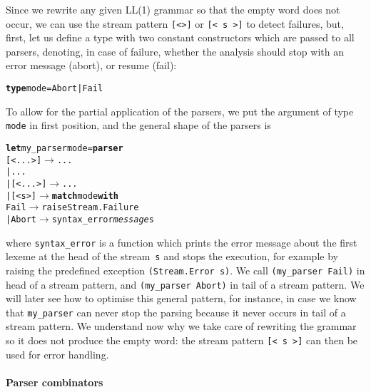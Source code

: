 Since we rewrite any given LL(1) grammar so that the empty word does
not occur, we can use the stream pattern \texttt{[<>]} or \texttt{[< s
    >]} to detect failures, but, first, let us define a type with two
constant constructors which are passed to all parsers, denoting, in
case of failure, whether the analysis should stop with an error
message (abort), or resume (fail):
\begin{alltt}
\textbf{type} mode = Abort | Fail
\end{alltt}
To allow for the partial application of the parsers, we put the
argument of type \texttt{mode} in first position, and the general
shape of the parsers is
\begin{alltt}
\textbf{let} my\_parser mode = \textbf{parser}
  [< ... >] \(\rightarrow\) ...
| ...
| [< ... >] \(\rightarrow\) ...
|   [< s >] \(\rightarrow\) \textbf{match} mode \textbf{with}
                 Fail  \(\rightarrow\) raise Stream.Failure
               | Abort \(\rightarrow\) syntax\_error \emph{message} s
\end{alltt}
where \texttt{syntax\_error} is a function which prints the error
message about the first lexeme at the head of the stream~\texttt{s}
and stops the execution, for example by raising the predefined
exception \texttt{(Stream.Error s)}. We call \texttt{(my\_parser
  Fail)} in head of a stream pattern, and \texttt{(my\_parser Abort)}
in tail of a stream pattern. We will later see how to optimise this
general pattern, for instance, in case we know that
\texttt{my\_parser} can never stop the parsing because it never occurs
in tail of a stream pattern. We understand now why we take care of
rewriting the grammar so it does not produce the empty word: the
stream pattern \texttt{[< s >]} can then be used for error handling.

\paragraph{Parser combinators}

